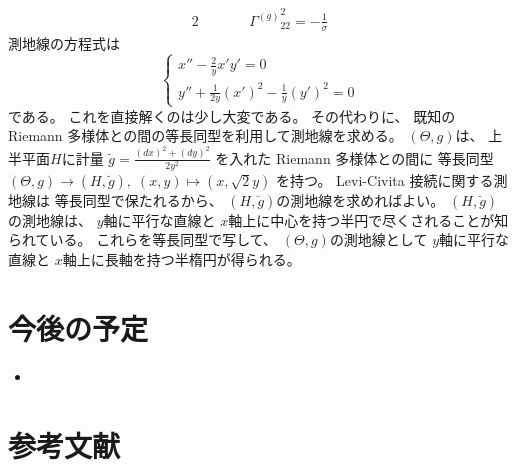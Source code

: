 \documentclass[report]{jlreq}
\begin{document}
\begin{example}[正規分布族]
\begin{alignat}{2}
            &&\qquad
                {\Gamma^{(g)}}_{22}^2
                    = -\frac{1}{\sigma}
    \end{alignat}
    測地線の方程式は
    \begin{equation}
        \begin{cases}
            x'' - \frac{2}{y} x' y' = 0 \\
            y'' + \frac{1}{2y} (x')^2 - \frac{1}{y} (y')^2 = 0
        \end{cases}
    \end{equation}
    である。
    これを直接解くのは少し大変である。
    その代わりに、
    既知の Riemann 多様体との間の等長同型を利用して測地線を求める。
    $(\Theta, g)$は、
    上半平面$H$に計量
    $\breve{g} = \frac{(dx)^2 + (dy)^2}{2y^2}$
    を入れた Riemann 多様体との間に
    等長同型$(\Theta, g) \to (H, \breve{g}), \;
        (x, y) \mapsto (x, \sqrt{2}y)$
    を持つ。
    Levi-Civita 接続に関する測地線は
    等長同型で保たれるから、
    $(H, \breve{g})$の測地線を求めればよい。
    $(H, \breve{g})$の測地線は、
    $y$軸に平行な直線と
    $x$軸上に中心を持つ半円で尽くされることが知られている。
    これらを等長同型で写して、
    $(\Theta, g)$の測地線として
    $y$軸に平行な直線と
    $x$軸上に長軸を持つ半楕円が得られる。
\end{example}


%
\section*{今後の予定}

\begin{itemize}
    \item \TODO{}
\end{itemize}

%
\section*{参考文献}

\nocite{amari_information_2016}

{
    \renewcommand{\bibsection}{}
    
    
}
\end{document}
